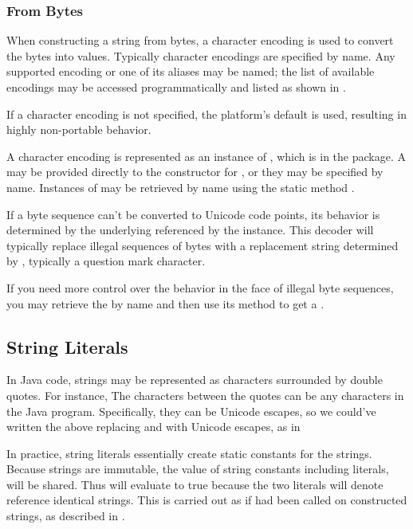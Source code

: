 \subsubsection{From Bytes}

When constructing a string from bytes, a character encoding is used to
convert the bytes into  values.  Typically character
encodings are specified by name.  Any supported encoding or one of its
aliases may be named; the list of available encodings may be accessed
programmatically and listed as shown in .

If a character encoding is not specified, the platform's default is
used, resulting in highly non-portable behavior.

A character encoding is represented as an instance of ,
which is in the  package.  A  may
be provided directly to the constructor for , or they may
be specified by name.  Instances of  may be retrieved by
name using the static method .

If a byte sequence can't be converted to Unicode code points, its
behavior is determined by the underlying 
referenced by the  instance.  This decoder will
typically replace illegal sequences of bytes with a replacement string
determined by , typically a
question mark character.  

If you need more control over the behavior in the face of illegal byte
sequences, you may retrieve the  by name and then use
its  method to get a .

\subsection{String Literals}

In Java code, strings may be represented as characters surrounded
by double quotes.  For instance,
%
%
The characters between the quotes can be any characters in the Java
program.  Specifically, they can be Unicode escapes, so we could've
written the above replacing  and  with Unicode
escapes, as in
%

In practice, string literals essentially create static constants for
the strings.  Because strings are immutable, the value of string
constants including literals, will be shared.  Thus  will evaluate to true because the two literals will denote
reference identical strings.  This is carried out as if
 had been called on constructed strings, as described
in .

